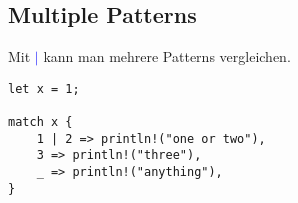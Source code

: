 \subsection{Multiple Patterns}
Mit \textbf{\textcolor{blue}{$\vert$}} kann man mehrere Patterns vergleichen.

\begin{lstlisting}
let x = 1;

match x {
    1 | 2 => println!("one or two"),
    3 => println!("three"),
    _ => println!("anything"),
}
\end{lstlisting}